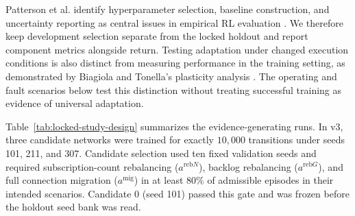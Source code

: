 Patterson et al. identify hyperparameter selection, baseline construction,
and uncertainty reporting as central issues in empirical RL evaluation
\cite{Patterson2024EmpiricalDesign}. We therefore keep development selection
separate from the locked holdout and report component metrics alongside return.
Testing adaptation under changed execution conditions is also distinct from
measuring performance in the training setting, as demonstrated by Biagiola and
Tonella's plasticity analysis \cite{Biagiola2022Plasticity}. The operating and
fault scenarios below test this distinction without treating successful
training as evidence of universal adaptation.

Table~\ref{tab:locked-study-design} summarizes the evidence-generating runs.
In v3, three candidate networks were trained for exactly $10{,}000$
transitions under seeds 101, 211, and 307.  Candidate selection used ten fixed
validation seeds and required subscription-count rebalancing
($a^{\mathrm{reb}N}$), backlog rebalancing ($a^{\mathrm{reb}G}$), and full
connection migration ($a^{\mathrm{mig}}$) in at least $80\%$ of admissible
episodes in their intended scenarios.  Candidate 0 (seed 101) passed this gate
and was frozen before the holdout seed bank was read.

